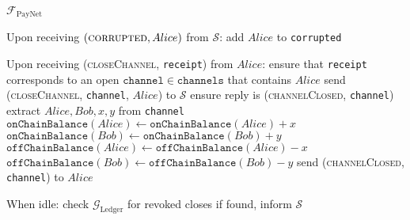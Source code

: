\begin{functionality}{$\mathcal{F}_{\mathrm{PayNet}}$}
\begin{algorithmic}[1]
    \State Upon receiving $\left(\textsc{corrupted}, Alice\right)$ from
    $\mathcal{S}$:
    \Indent
      \State add $Alice$ to \texttt{corrupted}
    \EndIndent
    \State

    \State Upon receiving (\textsc{closeChannel}, \texttt{receipt}) from $Alice$:
    \Indent
      \State ensure that \texttt{receipt} corresponds to an open
      $\mathtt{channel} \in \mathtt{channels}$ that contains $Alice$
      \State send (\textsc{closeChannel}, \texttt{channel}, $Alice$) to
      $\mathcal{S}$
      \State ensure reply is (\textsc{channelClosed}, \texttt{channel})
      \State extract $Alice, Bob, x, y$ from \texttt{channel}
      \State $\mathtt{onChainBalance}\left(Alice\right) \gets
      \mathtt{onChainBalance}\left(Alice\right) + x$
      \State $\mathtt{onChainBalance}\left(Bob\right) \gets
      \mathtt{onChainBalance}\left(Bob\right) + y$
      \State $\mathtt{offChainBalance}\left(Alice\right) \gets
      \mathtt{offChainBalance}\left(Alice\right) - x$
      \State $\mathtt{offChainBalance}\left(Bob\right) \gets
      \mathtt{offChainBalance}\left(Bob\right) - y$
      \State send (\textsc{channelClosed}, \texttt{channel}) to $Alice$
    \EndIndent
    \State

    \State When idle: 
    \Indent
          \State check $\mathcal{G}_{\mathrm{Ledger}}$ for revoked closes
          \State if found, inform $\mathcal{S}$
        \EndIf
      \EndFor
    \EndIndent
  \end{algorithmic}
\end{functionality}
